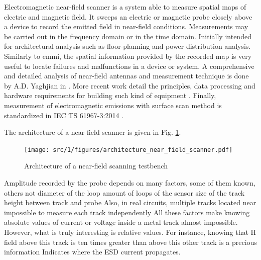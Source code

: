 Electromagnetic near-field scanner is a system able to measure spatial maps of electric and magnetic field.
It sweeps an electric or magnetic probe closely above a device to record the emitted field in near-field conditions.
Measurements may be carried out in the frequency domain or in the time domain.
Initially intended for architectural analysis such as floor-planning and power distribution analysis.
Similarly to \gls{emmi}, the spatial information provided by the recorded map is very useful to locate failures and malfunctions in a device or system.
A comprehensive and detailed analysis of near-field antennas and measurement technique is done by A.D. Yaghjian in \cite{nfsFirstStudy}.
More recent work detail the principles, data processing and hardware requirements for building such kind of equipment \cite{planarNFSAntenna, NFSMeasurements, NFScanner}.
Finally, measurement of electromagnetic emissions with surface scan method is standardized in IEC TS 61967-3:2014 \cite{}.

The architecture of a near-field scanner is given in Fig. \ref{fig:near-field-scanner}.

\begin{figure}[!h]
  \centering
  \texttt{[image: src/1/figures/architecture\_near\_field\_scanner.pdf]}
  \caption{Architecture of a near-field scanning testbench}
  \label{fig:near-field-scanner}
\end{figure}

Amplitude recorded by the probe depends on many factors, some of them known, others not
diameter of the loop
amount of loops of the sensor
size of the track
height between track and probe
Also, in real circuits, multiple tracks located near
impossible to measure each track independently
All these factors make knowing absolute values of current or voltage inside a metal track almost impossible.
However, what is truly interesting is relative values.
For instance, knowing that H field above this track is ten times greater than above this other track is a precious information
Indicates where the ESD current propagates.


